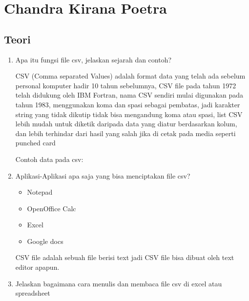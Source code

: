 \section{Chandra Kirana Poetra}
\subsection{Teori}
\begin{enumerate}
\item Apa itu fungsi file csv, jelaskan sejarah dan contoh?

CSV (Comma separated Values) adalah format data yang telah ada sebelum personal komputer hadir 10 tahun sebelumnya, CSV file pada tahun 1972 telah didukung oleh IBM Fortran, nama CSV sendiri mulai digunakan pada tahun 1983, menggunakan koma dan spasi sebagai pembatas, jadi karakter string yang tidak dikutip tidak bisa mengandung koma atau spasi, list CSV lebih mudah untuk diketik daripada data yang diatur berdasarkan kolum, dan lebih terhindar dari hasil yang salah jika di cetak pada media seperti punched card

Contoh data pada csv:


\item  Aplikasi-Aplikasi apa saja yang bisa menciptakan file csv?

\begin{itemize}
	\item Notepad
	\item OpenOffice Calc
	\item Excel
  	\item Google docs
\end{itemize}
CSV file adalah sebuah file berisi text jadi CSV file bisa dibuat oleh text editor apapun.

\item Jelaskan bagaimana cara menulis dan membaca file csv di excel atau spreadsheet


\end{enumerate}
